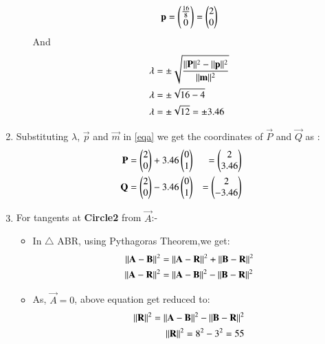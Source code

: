 \documentclass[journal,12pt,twocolumn]{IEEEtran}
\begin{document}
\begin{enumerate}
\begin{itemize}
 \begin{align}
 \mathbf{p}=\begin{pmatrix}\frac{16}{8}\\0\end{pmatrix}=\begin{pmatrix}2\\0\end{pmatrix}
\end{align}
And
\begin{align}
\lambda &= \pm\sqrt{\frac{\lVert\mathbf{P}\rVert^2-\lVert\mathbf{p}\rVert^2}{\lVert\mathbf{m}\rVert^2}}
\\
\lambda &= \pm\sqrt{16-4}
\\
\lambda &= \pm\sqrt{12}=\pm 3.46
\end{align}
\end{itemize}
\item Substituting $\lambda$, $\vec{p}$ and $\vec{m}$ in \eqref{eqa} we get the coordinates of $\vec{P}$ and  $\vec{Q}$ as :
\begin{align}
\mathbf{P}&=\begin{pmatrix}2\\0\end{pmatrix}+ 3.46\begin{pmatrix}0\\1\end{pmatrix}&=\begin{pmatrix}2\\3.46\end{pmatrix}
\\
\mathbf{Q}&=\begin{pmatrix}2\\0\end{pmatrix}- 3.46\begin{pmatrix}0\\1\end{pmatrix}&=\begin{pmatrix}2\\-3.46\end{pmatrix}
\end{align}
\item For tangents at \textbf{Circle2} from $\vec{A}$:-
\begin{itemize}
\item In $\triangle$ ABR, using Pythagoras Theorem,we get:
\begin{align}
    \lVert\mathbf{A}-\mathbf{B}\rVert^2 &= \lVert\mathbf{A}-\mathbf{R}\rVert^2+ \lVert\mathbf{B}-\mathbf{R}\rVert^2
    \\
    \lVert\mathbf{A}-\mathbf{R}\rVert^2 &=\lVert\mathbf{A}-\mathbf{B}\rVert^2 - \lVert\mathbf{B}-\mathbf{R}\rVert^2
    \end{align}
    \item As, $\vec{A}=0$, above equation get reduced to:
    \begin{align}
    \lVert\mathbf{R}\rVert^2 = \lVert\mathbf{A}-\mathbf{B}\rVert^2 - \lVert\mathbf{B}-\mathbf{R}\rVert^2 
    \\
    \lVert\mathbf{R}\rVert^2= 8^2 -3^2=55 \label{eqc}
\end{align}
\end{itemize}



\end{enumerate}
\end{document}
